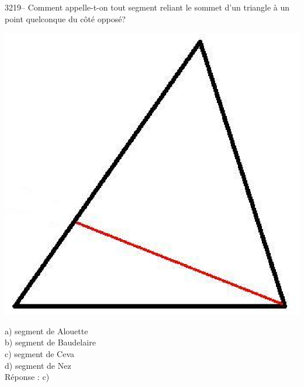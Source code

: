 \documentclass[letterpaper, 12pt]{article}
\begin{document}
3219-- Comment appelle-t-on tout segment reliant le sommet d'un triangle \`a un point quelconque du c\^ot\'e oppos\'e?
\begin{center}
\includegraphics[scale=0.25]{segmentCeva.eps}\\[5mm]
\end{center}

a) segment de Alouette\\
b) segment de Baudelaire\\
c) segment de Ceva\\
d) segment de Nez\\

R\'eponse : c)\\
\end{document}
